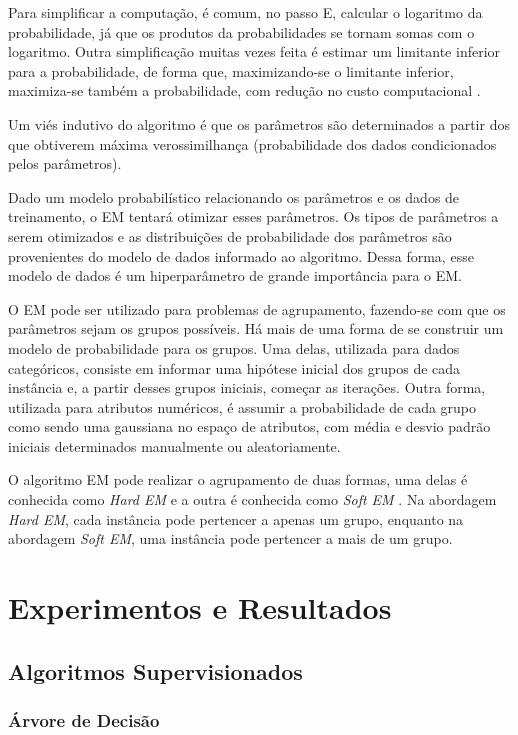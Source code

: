 \documentclass{article}
\begin{document}
Para simplificar a computação, é comum, no passo E, calcular o logaritmo da probabilidade, já que os produtos da probabilidades se tornam somas com o logaritmo. Outra simplificação muitas vezes feita é estimar um limitante inferior para a probabilidade, de forma que, maximizando-se o limitante inferior, maximiza-se também a probabilidade, com redução no custo computacional \cite{Dellaert}.

Um viés indutivo do algoritmo é que os parâmetros são determinados a partir dos que obtiverem máxima verossimilhança (probabilidade dos dados condicionados pelos parâmetros).

Dado um modelo probabilístico relacionando os parâmetros e os dados de treinamento, o EM tentará otimizar esses parâmetros. Os tipos de parâmetros a serem otimizados e as distribuições de probabilidade dos parâmetros são provenientes do modelo de dados informado ao algoritmo. Dessa forma, esse modelo de dados é um hiperparâmetro de grande importância para o EM.

O EM pode ser utilizado para problemas de agrupamento, fazendo-se com que os parâmetros sejam os grupos possíveis. Há mais de uma forma de se construir um modelo de probabilidade para os grupos. Uma delas, utilizada para dados categóricos, consiste em informar uma hipótese inicial dos grupos de cada instância e, a partir desses grupos iniciais, começar as iterações. Outra forma, utilizada para atributos numéricos, é assumir a probabilidade de cada grupo como sendo uma gaussiana no espaço de atributos, com média e desvio padrão iniciais determinados manualmente ou aleatoriamente.

O algoritmo EM pode realizar o agrupamento de duas formas, uma delas é conhecida como {\it Hard EM} e a outra é conhecida como {\it Soft EM} \cite{mcallester}. Na abordagem {\it Hard EM}, cada instância pode pertencer a apenas um grupo, enquanto na abordagem {\it Soft EM}, uma instância pode pertencer a mais de um grupo.

\section{Experimentos e Resultados}

\subsection{Algoritmos Supervisionados}

\subsubsection{Árvore de Decisão}
\end{document}
